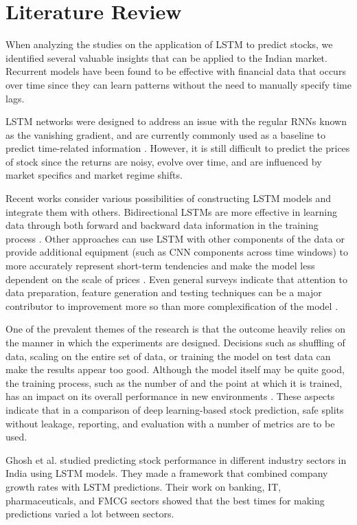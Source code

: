 \documentclass[conference]{IEEEtran}
\begin{document}
\section{Literature Review}

When analyzing the studies on the application of LSTM to predict stocks, we identified several valuable insights that can be applied to the Indian market. Recurrent models have been found to be effective with financial data that occurs over time since they can learn patterns without the need to manually specify time lags.

LSTM networks were designed to address an issue with the regular RNNs known as the vanishing gradient, and are currently commonly used as a baseline to predict time-related information \cite{b4}. However, it is still difficult to predict the prices of stock since the returns are noisy, evolve over time, and are influenced by market specifics and market regime shifts.

Recent works consider various possibilities of constructing LSTM models and integrate them with others. Bidirectional LSTMs are more effective in learning data through both forward and backward data information in the training process \cite{b13}. Other approaches can use LSTM with other components of the data or provide additional equipment (such as CNN components across time windows) to more accurately represent short-term tendencies and make the model less dependent on the scale of prices \cite{b10}. Even general surveys indicate that attention to data preparation, feature generation and testing techniques can be a major contributor to improvement more so than more complexification of the model \cite{b12}.

One of the prevalent themes of the research is that the outcome heavily relies on the manner in which the experiments are designed. Decisions such as shuffling of data, scaling on the entire set of data, or training the model on test data can make the results appear too good. Although the model itself may be quite good, the training process, such as the number of and the point at which it is trained, has an impact on its overall performance in new environments \cite{b6}. These aspects indicate that in a comparison of deep learning-based stock prediction, safe splits without leakage, reporting, and evaluation with a number of metrics are to be used.

Ghosh et al. \cite{b3} studied predicting stock performance in different industry sectors in India using LSTM models. They made a framework that combined company growth rates with LSTM predictions. Their work on banking, IT, pharmaceuticals, and FMCG sectors showed that the best times for making predictions varied a lot between sectors.
\end{document}
